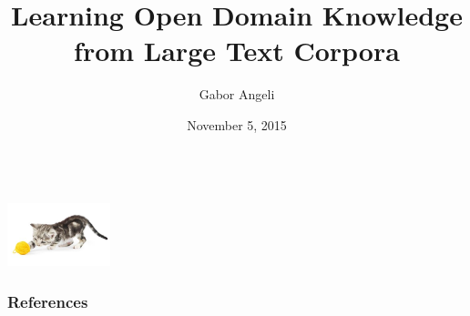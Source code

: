 \documentclass[hyperref]{beamer}
\title[Learning Knowledge From Text]{Learning Open Domain Knowledge from Large Text Corpora}
\subtitle{}
\author{Gabor Angeli}
\date{November 5, 2015}
\institute[Stanford]{Stanford University}
\begin{document}
\begin{frame}[noframenumbering]
  \titlepage
\end{frame}





\begin{frame}[noframenumbering]{}
\begin{center}
   \\
  \vspace{1cm}
  \includegraphics[width=3cm]{../img/yarn-cat.jpg} \\
\end{center}
\end{frame}



\begin{frame}[allowframebreaks]
  \frametitle{References}
  
  
\end{frame}
\end{document}

